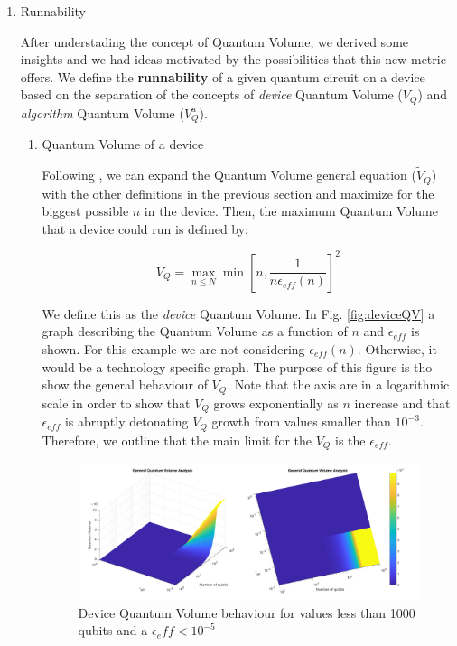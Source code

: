 \begin{enumerate}
\begin{enumerate}
\item Runnability
\label{sec:org2c4a3e1}

After understading the concept of Quantum Volume, we derived some insights and we had ideas motivated by the possibilities that this new metric offers. 
We define the \textbf{runnability} of a given quantum circuit on a device based on the separation of the concepts of \emph{device} Quantum Volume (\(V_Q\)) and \emph{algorithm} Quantum Volume (\(V^a_Q\)).


\begin{enumerate}
\item Quantum Volume of a device
\label{sec:org3fc2502}

Following \cite{Bishop_2017,Moll_2018}, we can expand the Quantum Volume general equation (\(\tilde{V}_Q\)) with the other definitions in the previous section and maximize for the biggest possible \(n\) in the device. 
Then, the maximum Quantum Volume that a device could run is defined by:

\begin{equation}
\label{eq:org8b2364e}
V_Q = \max_{n \le N} \min \left[ n,\frac{1}{n \epsilon_{eff} (n)}\right]^2
\end{equation}

We define this as the \emph{device} Quantum Volume. 
In Fig. \ref{fig:deviceQV} a graph describing the Quantum Volume as a function of \(n\) and \(\epsilon_{eff}\) is shown.
For this example we are not considering \(\epsilon_{eff} (n)\).
Otherwise, it would be a technology specific graph.
The purpose of this figure is tho show the general behaviour of \(V_Q\).
Note that the axis are in a logarithmic scale in order to show that \(V_Q\) grows exponentially as \(n\) increase and that \(\epsilon_{eff}\) is abruptly detonating \(V_Q\) growth from values smaller than \(10^{-3}\).
Therefore, we outline that the main limit for the \(V_Q\) is the \(\epsilon_{eff}\).

\begin{figure}[htbp]
\centering
\includegraphics[width=\textwidth]{figures/general_QV.png}
\caption{\label{fig:org021f05c}
Device Quantum Volume behaviour for values less than 1000 qubits and a \(\epsilon_eff < 10^{-5}\)}
\end{figure}


\end{enumerate}
\end{enumerate}
\end{enumerate}
